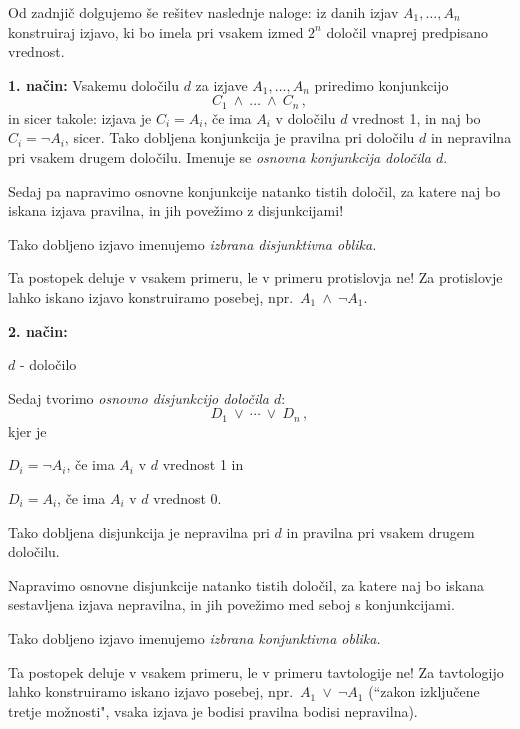 \documentclass[11pt,paper=b5,DIV=13,headinclude,footinclude]{scrbook}
\def\ali {{~\vee~}}
\def\inn {{~\wedge~}}
\begin{document}
Od zadnjič dolgujemo še rešitev naslednje naloge: iz danih izjav $A_1,\ldots, A_n$ konstruiraj izjavo,
ki bo imela pri vsakem izmed $2^n$ določil vnaprej predpisano vrednost.

\textbf{ 1. način:}
Vsakemu določilu $d$ za izjave $A_1,\ldots, A_n$ priredimo konjunkcijo
$$C_1\inn \ldots \inn C_n\,,$$
in sicer takole: izjava je $C_i = A_i$, če ima $A_i$ v določilu $d$ vrednost 1, in naj bo
$C_i = \neg A_i$, sicer.
Tako dobljena konjunkcija je pravilna pri določilu $d$ in nepravilna pri vsakem drugem določilu.
Imenuje se {\em osnovna konjunkcija določila $d$}.

Sedaj pa napravimo osnovne konjunkcije natanko tistih določil, za katere naj
bo iskana izjava pravilna, in jih povežimo z disjunkcijami!

Tako dobljeno izjavo imenujemo {\em izbrana disjunktivna oblika.}

Ta postopek deluje v vsakem primeru, le v primeru protislovja ne! Za protislovje lahko iskano izjavo
konstruiramo posebej, npr.~$A_1\inn \neg A_1$.

\bigskip
\textbf{ 2. način:}

$d$ - določilo

Sedaj tvorimo {\em osnovno disjunkcijo določila $d$}:
$$D_1\ali \cdots \ali D_n\,,$$
kjer je

$D_i = \neg A_i$, če ima $A_i$ v $d$ vrednost 1 in

$D_i = A_i$, če ima $A_i$ v $d$ vrednost 0.

Tako dobljena disjunkcija je nepravilna pri $d$  in pravilna pri vsakem drugem določilu.

Napravimo osnovne disjunkcije natanko tistih določil, za katere naj bo iskana sestavljena izjava nepravilna,
in jih povežimo med seboj s konjunkcijami.

Tako dobljeno izjavo imenujemo {\em izbrana konjunktivna oblika.}

Ta postopek deluje v vsakem primeru, le v primeru tavtologije ne! Za tavtologijo
lahko konstruiramo iskano izjavo posebej, npr.~$A_1\ali \neg A_1$ (``zakon izključene tretje možnosti", vsaka
izjava je bodisi pravilna bodisi nepravilna).
\end{document}
